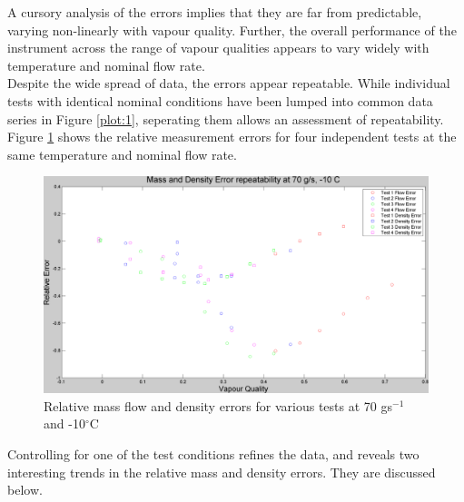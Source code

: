 \documentclass{report}
\begin{document}
\FloatBarrier
A cursory analysis of the errors implies that they are far from predictable, varying non-linearly with vapour quality. Further, the overall performance of the instrument across the range of vapour qualities appears to vary widely with temperature and nominal flow rate.\\
Despite the wide spread of data, the errors appear repeatable. While individual tests with identical nominal conditions have been lumped into common data series in Figure \ref{plot:1}, seperating them allows an assessment of repeatability. Figure \ref{plot:11} shows the relative measurement errors for four independent tests at the same temperature and nominal flow rate. 
\FloatBarrier
\begin{figure}
\includegraphics[width=\textwidth]{plots/fig11}
\caption{Relative mass flow and density errors for various tests at 70 gs$^{-1}$ and -10$^\circ$C}
\label{plot:11}
\end{figure}
\FloatBarrier
Controlling for one of the test conditions refines the data, and reveals two interesting trends in the relative mass and density errors. They are discussed below.
\FloatBarrier
\end{document}
